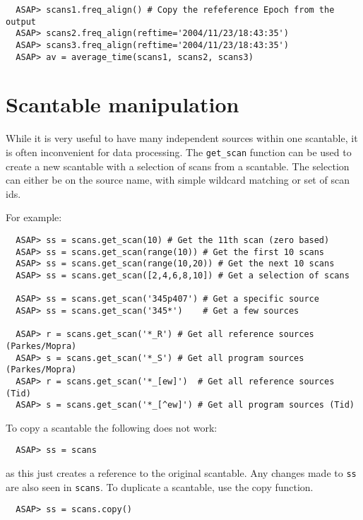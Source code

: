 \documentclass[11pt]{article}
\newcommand{\cmd}[1]{{\tt #1}}
\begin{document}
\begin{verbatim}
  ASAP> scans1.freq_align() # Copy the refeference Epoch from the output
  ASAP> scans2.freq_align(reftime='2004/11/23/18:43:35')
  ASAP> scans3.freq_align(reftime='2004/11/23/18:43:35')
  ASAP> av = average_time(scans1, scans2, scans3)
\end{verbatim}

\section{Scantable manipulation}

While it is very useful to have many
independent sources within one scantable, it is often inconvenient for
data processing. The \cmd{get\_scan} function can be used to create a
new scantable with a selection of scans from a scantable. The
selection can either be on the source name, with simple wildcard
matching or set of scan ids.

For example:

\begin{verbatim}
  ASAP> ss = scans.get_scan(10) # Get the 11th scan (zero based)
  ASAP> ss = scans.get_scan(range(10)) # Get the first 10 scans
  ASAP> ss = scans.get_scan(range(10,20)) # Get the next 10 scans
  ASAP> ss = scans.get_scan([2,4,6,8,10]) # Get a selection of scans

  ASAP> ss = scans.get_scan('345p407') # Get a specific source
  ASAP> ss = scans.get_scan('345*')    # Get a few sources

  ASAP> r = scans.get_scan('*_R') # Get all reference sources (Parkes/Mopra)
  ASAP> s = scans.get_scan('*_S') # Get all program sources (Parkes/Mopra)
  ASAP> r = scans.get_scan('*_[ew]')  # Get all reference sources (Tid)
  ASAP> s = scans.get_scan('*_[^ew]') # Get all program sources (Tid)

\end{verbatim}

To copy a scantable the following does not work:

\begin{verbatim}
  ASAP> ss = scans
\end{verbatim}

as this just creates a reference to the original scantable. Any
changes made to \cmd{ss} are also seen in \cmd{scans}. To duplicate a
scantable, use the copy function.

\begin{verbatim}
  ASAP> ss = scans.copy()
\end{verbatim}
\end{document}
